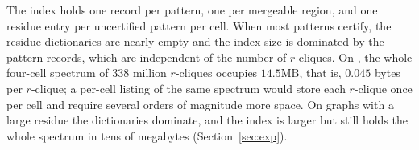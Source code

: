The index holds one record per pattern, one per mergeable region, and one residue entry per uncertified pattern per cell.
%
When most patterns certify, the residue dictionaries are nearly empty and the index size is dominated by the pattern records, which are independent of the number of $r$-cliques.
%
On \daWIT, the whole four-cell spectrum of $338$ million $r$-cliques occupies $14.5$MB, that is, $0.045$ bytes per $r$-clique; a per-cell listing of the same spectrum would store each $r$-clique once per cell and require several orders of magnitude more space.
%
On graphs with a large residue the dictionaries dominate, and the index is larger but still holds the whole spectrum in tens of megabytes (Section~\ref{sec:exp}).

